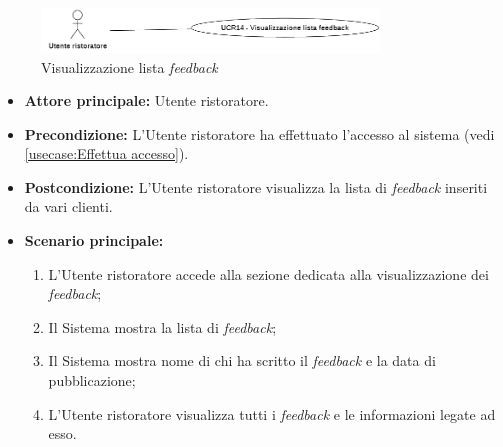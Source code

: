 \newpage
{}
\label{usecase:Visualizzazione lista feedback}

\begin{figure}[h]
	\centering
	\includegraphics[width=0.8\textwidth]{./uml/UCR14.png} 
	\caption{Visualizzazione lista \textit{feedback}}
	\label{fig:UCR14}
  \end{figure}

\begin{itemize}
	\item \textbf{Attore principale:} Utente ristoratore.

	\item \textbf{Precondizione:} L'Utente ristoratore ha effettuato l'accesso al sistema (vedi \autoref{usecase:Effettua accesso}).

	\item \textbf{Postcondizione:} L'Utente ristoratore visualizza la lista di \textit{feedback} inseriti da vari clienti.


	\item \textbf{Scenario principale:}
	      \begin{enumerate}
		      \item L'Utente ristoratore accede alla sezione dedicata alla visualizzazione dei \textit{feedback};

		      \item Il Sistema mostra la lista di \textit{feedback};

		      \item Il Sistema mostra nome di chi ha scritto il \textit{feedback} e la data di pubblicazione;

		      \item L'Utente ristoratore visualizza tutti i \textit{feedback} e le informazioni legate ad esso.
	      \end{enumerate}
\end{itemize}

